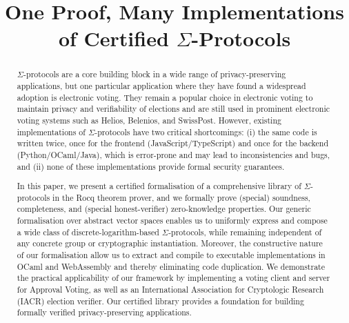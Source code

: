 \documentclass[sigconf,anonymous,review]{acmart}
\begin{document}
\title{One Proof, Many Implementations of Certified $\Sigma$-Protocols}




\begin{abstract}
  $\Sigma$-protocols are a core building block in a wide range of privacy-preserving applications, but 
  one particular application where they have found a widespread adoption is electronic voting.
  They remain a popular choice in electronic voting to maintain privacy 
  and verifiability of elections and are still used in prominent electronic voting systems such as 
  Helios, Belenios, and SwissPost. However, existing implementations of $\Sigma$-protocols have two 
  critical shortcomings: (i) the same code is written twice, once for the frontend (JavaScript/TypeScript)
  and once for the backend (Python/OCaml/Java), which is error-prone and may lead to inconsistencies and bugs, and (ii) none of these implementations provide formal security guarantees.
  
  In this paper, we present a certified formalisation of a comprehensive library of $\Sigma$-protocols 
  in the Rocq theorem prover, and we formally prove (special) soundness, completeness, and 
  (special honest-verifier) zero-knowledge properties. Our generic formalisation over abstract vector spaces enables us to uniformly express and compose a wide class of discrete-logarithm-based $\Sigma$-protocols, while remaining independent of any concrete group or cryptographic instantiation. Moreover, the constructive nature of our formalisation allow us to extract and compile to executable implementations in OCaml and WebAssembly and thereby
  eliminating code duplication. We demonstrate the practical applicability of our framework by implementing a voting client and server for Approval Voting, as well as an International Association for Cryptologic Research (IACR) election verifier. Our certified library provides a foundation for 
  building formally verified privacy-preserving applications. 


 


\end{abstract}
\end{document}
